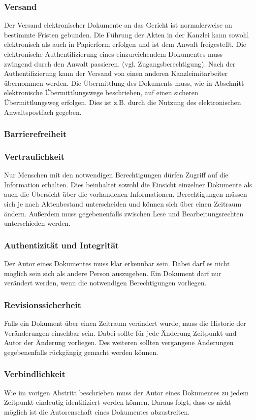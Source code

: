 \subsubsection*{Versand}
Der Versand elektronischer Dokumente an das Gericht ist normalerweise an bestimmte Fristen gebunden.
Die Führung der Akten in der Kanzlei kann sowohl elektronisch als auch in Papierform erfolgen und ist dem Anwalt freigestellt. Die elektronische Authentifizierung eines einzureichendem Dokumentes muss zwingend durch den Anwalt passieren. (vgl. Zugangsberechtigung). Nach der Authentifizierung kann der Versand von einen anderen Kanzleimitarbeiter übernommen werden. Die Übermittlung des Dokuments muss, wie in Abschnitt elektronische Übermittlungswege beschrieben, auf einen sicheren Übermittlungsweg erfolgen. Dies ist z.B. durch die Nutzung des elektronischen Anwaltspostfach gegeben.
\subsubsection*{Barrierefreiheit}

\subsubsection*{Vertraulichkeit}
Nur Menschen mit den notwendigen Berechtigungen dürfen Zugriff auf die Information erhalten. Dies beinhaltet sowohl die Einsicht einzelner Dokumente als auch die Übersicht über die vorhandenen Informationen. Berechtigungen müssen sich je nach Aktenbestand unterscheiden und können sich über einen Zeitraum ändern. Außerdem muss gegebenenfalls zwischen Lese und Bearbeitungsrechten unterschieden werden.
\subsubsection*{Authentizität und Integrität}
Der Autor eines Dokumentes muss klar erkennbar sein. Dabei darf es nicht möglich sein sich als andere Person auszugeben. Ein Dokument darf nur verändert werden, wenn die notwendigen Berechtigungen vorliegen. 
\subsubsection*{Revisionssicherheit}
Falls ein Dokument über einen Zeitraum verändert wurde, muss die Historie der Veränderungen einsehbar sein. Dabei sollte für jede Änderung Zeitpunkt und Autor der Änderung vorliegen. Des weiteren sollten vergangene Änderungen gegebenenfalls rückgängig gemacht werden können.
\subsubsection*{Verbindlichkeit}
Wie im vorigen Abstritt beschrieben muss der Autor eines Dokumentes zu jedem Zeitpunkt eindeutig identifiziert werden können. Daraus folgt, dass es nicht möglich ist die Autorenschaft eines Dokumentes abzustreiten.
